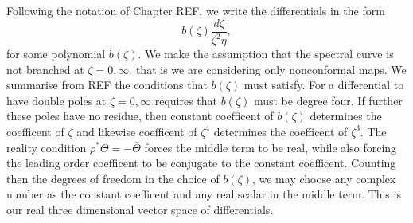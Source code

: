 Following the notation of Chapter REF, we write the differentials in the form
\[
b(ζ)\frac{dζ}{ζ^2η},
\]
for some polynomial $b(ζ)$. We make the assumption that the spectral curve is not branched at $ζ=0,\infty$, that is we are considering only nonconformal maps. We summarise from REF  the conditions that $b(ζ)$ must satisfy. For a differential to have double poles at $ζ=0,\infty$ requires that $b(ζ)$ must be degree four. If further these poles have no residue, then constant coefficent of $b(ζ)$ determines the coefficent of $ζ$ and likewise coefficent of $ζ^4$ determines the coefficent of $ζ^3$. The reality condition $ρ^* Θ = -\bar{Θ}$ forces the middle term to be real, while also forcing the leading order coefficent to be conjugate to the constant coefficent. Counting then the degrees of freedom in the choice of $b(ζ)$, we may choose any complex number as the constant coefficent and any real scalar in the middle term. This is our real three dimensional vector space of differentials.

